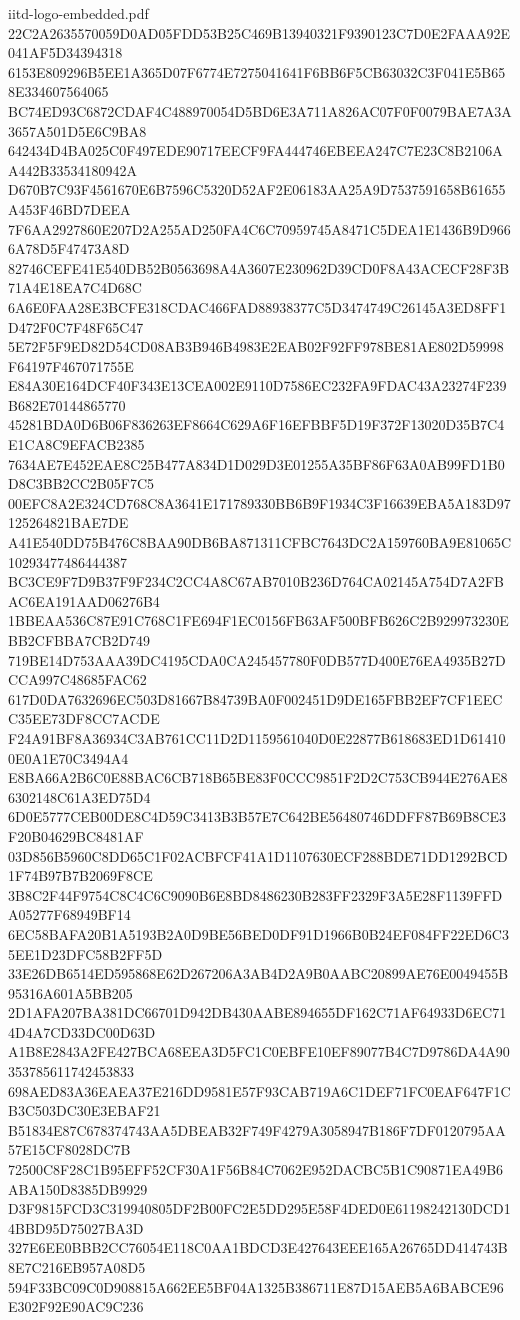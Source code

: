 \begin{filecontents*}[overwrite]{iitd-logo-embedded.pdf}
22C2A2635570059D0AD05FDD53B25C469B13940321F9390123C7D0E2FAAA92E041AF5D34394318
6153E809296B5EE1A365D07F6774E7275041641F6BB6F5CB63032C3F041E5B658E334607564065
BC74ED93C6872CDAF4C488970054D5BD6E3A711A826AC07F0F0079BAE7A3A3657A501D5E6C9BA8
642434D4BA025C0F497EDE90717EECF9FA444746EBEEA247C7E23C8B2106AA442B33534180942A
D670B7C93F4561670E6B7596C5320D52AF2E06183AA25A9D7537591658B61655A453F46BD7DEEA
7F6AA2927860E207D2A255AD250FA4C6C70959745A8471C5DEA1E1436B9D9666A78D5F47473A8D
82746CEFE41E540DB52B0563698A4A3607E230962D39CD0F8A43ACECF28F3B71A4E18EA7C4D68C
6A6E0FAA28E3BCFE318CDAC466FAD88938377C5D3474749C26145A3ED8FF1D472F0C7F48F65C47
5E72F5F9ED82D54CD08AB3B946B4983E2EAB02F92FF978BE81AE802D59998F64197F467071755E
E84A30E164DCF40F343E13CEA002E9110D7586EC232FA9FDAC43A23274F239B682E70144865770
45281BDA0D6B06F836263EF8664C629A6F16EFBBF5D19F372F13020D35B7C4E1CA8C9EFACB2385
7634AE7E452EAE8C25B477A834D1D029D3E01255A35BF86F63A0AB99FD1B0D8C3BB2CC2B05F7C5
00EFC8A2E324CD768C8A3641E171789330BB6B9F1934C3F16639EBA5A183D97125264821BAE7DE
A41E540DD75B476C8BAA90DB6BA871311CFBC7643DC2A159760BA9E81065C10293477486444387
BC3CE9F7D9B37F9F234C2CC4A8C67AB7010B236D764CA02145A754D7A2FBAC6EA191AAD06276B4
1BBEAA536C87E91C768C1FE694F1EC0156FB63AF500BFB626C2B929973230EBB2CFBBA7CB2D749
719BE14D753AAA39DC4195CDA0CA245457780F0DB577D400E76EA4935B27DCCA997C48685FAC62
617D0DA7632696EC503D81667B84739BA0F002451D9DE165FBB2EF7CF1EECC35EE73DF8CC7ACDE
F24A91BF8A36934C3AB761CC11D2D1159561040D0E22877B618683ED1D614100E0A1E70C3494A4
E8BA66A2B6C0E88BAC6CB718B65BE83F0CCC9851F2D2C753CB944E276AE86302148C61A3ED75D4
6D0E5777CEB00DE8C4D59C3413B3B57E7C642BE56480746DDFF87B69B8CE3F20B04629BC8481AF
03D856B5960C8DD65C1F02ACBFCF41A1D1107630ECF288BDE71DD1292BCD1F74B97B7B2069F8CE
3B8C2F44F9754C8C4C6C9090B6E8BD8486230B283FF2329F3A5E28F1139FFDA05277F68949BF14
6EC58BAFA20B1A5193B2A0D9BE56BED0DF91D1966B0B24EF084FF22ED6C35EE1D23DFC58B2FF5D
33E26DB6514ED595868E62D267206A3AB4D2A9B0AABC20899AE76E0049455B95316A601A5BB205
2D1AFA207BA381DC66701D942DB430AABE894655DF162C71AF64933D6EC714D4A7CD33DC00D63D
A1B8E2843A2FE427BCA68EEA3D5FC1C0EBFE10EF89077B4C7D9786DA4A90353785611742453833
698AED83A36EAEA37E216DD9581E57F93CAB719A6C1DEF71FC0EAF647F1CB3C503DC30E3EBAF21
B51834E87C678374743AA5DBEAB32F749F4279A3058947B186F7DF0120795AA57E15CF8028DC7B
72500C8F28C1B95EFF52CF30A1F56B84C7062E952DACBC5B1C90871EA49B6ABA150D8385DB9929
D3F9815FCD3C319940805DF2B00FC2E5DD295E58F4DED0E61198242130DCD14BBD95D75027BA3D
327E6EE0BBB2CC76054E118C0AA1BDCD3E427643EEE165A26765DD414743B8E7C216EB957A08D5
594F33BC09C0D908815A662EE5BF04A1325B386711E87D15AEB5A6BABCE96E302F92E90AC9C236

\end{filecontents*}
